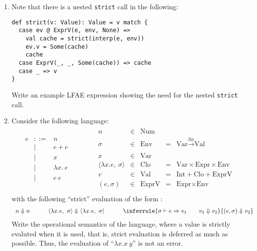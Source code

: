 \begin{enumerate}
\begin{itemize}
\end{itemize}

\item Note that there is a nested \texttt{strict} call in the following:

\begin{verbatim}
def strict(v: Value): Value = v match {
  case ev @ ExprV(e, env, None) =>
    val cache = strict(interp(e, env))
    ev.v = Some(cache)
    cache
  case ExprV(_, _, Some(cache)) => cache
  case _ => v
}
\end{verbatim}
Write an example LFAE expression showing the need for the nested \texttt{strict} call.

\item Consider the following language:
\[
\begin{array}{lll}
\begin{array}{rrl}
\\
  e & ::= & n\\
        & | & e + e\\
        & | & x\\
        & | & \lambda x.\ e\\
        & | & e\ e\\
\end{array}
&\qquad&
\begin{array}{rclcl}
n & \in & \mbox{Num}&&\\
  \sigma &\in& \mbox{Env} &=& {\mbox{Var}} \xrightarrow[]{\text{fin}} {\mbox{Val}}\\
  x &\in& \mbox{Var} &&\\

  \langle\lambda x. e,\ \sigma\rangle &\in& \mbox{Clo} &=& \mbox{Var} \times \mbox{Expr} \times \mbox{Env}\\
  v &\in& \mbox{Val} &=& \mbox{Int} + \mbox{Clo} + \mbox{ExprV}\\
  (e, \sigma) &\in& \mbox{ExprV} &=& \mbox{Expr} \times \mbox{Env}\\
\end{array}
\end{array}
\]
with the following ``strict'' evaluation of the form :
\[
\begin{array}{lll}
n \Downarrow n
&\qquad
\langle\lambda x. e,\ \sigma\rangle \Downarrow \langle\lambda x. e,\ \sigma\rangle
&\qquad
\inferrule
{\sigma \vdash e \Rightarrow v_1 \qquad
v_1 \Downarrow v_2 }
{(e, \sigma) \Downarrow v_2}
\end{array}
\]
Write the operational semantics of the language, where a value is strictly evaluted
when it is used, that is, strict evaluation is deferred as much as possible.
Thus, the evaluation of ``$\lambda x.x~y$'' is not an error.


\end{enumerate}

